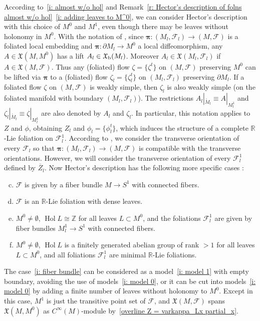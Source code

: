 \documentclass{memo-l}
\theoremstyle{plain}
\theoremstyle{definition}
\theoremstyle{remark}
\newcommand{\R}{\mathbb{R}}
\newcommand{\Z}{\mathbb{Z}}
\newcommand{\FF}{\mathcal{F}}
\newcommand{\fX}{\mathfrak{X}}
\newcommand{\bfpi}{\boldsymbol{\pi}}
\newcommand{\Hol}{\operatorname{Hol}}
\newcommand{\fXb}{\fX_{\text{\rm b}}}
\numberwithin{section}{chapter}
\numberwithin{equation}{section}%
\begin{document}
According to~\ref{i: almost w/o hol} and Remark~\ref{r: Hector's description of folns almost w/o hol}~\ref{i: adding leaves to M^0}, we can consider Hector's description with this choice of $M^0$ and $M^1$, even though there may be leaves without holonomy in $M^0$. With the notation of , since $\bfpi:(M_l,\FF_l)\to(M,\FF)$ is a foliated local embedding and $\bfpi:\partial M_l\to M^0$ a local diffeomorphism, any $A\in\fX(M,M^0)$ has a lift $A_l\in\fXb(M_l)$. Moreover $A_l\in\fX(M_l,\FF_l)$ if $A\in\fX(M,\FF)$. Thus any (foliated) flow $\zeta=\{\zeta^t\}$ on $(M,\FF)$ preserving $M^0$ can be lifted via $\bfpi$ to a (foliated) flow $\zeta_l=\{\zeta_l^t\}$ on $(M_l,\FF_l)$ preserving $\partial M_l$. If a foliated flow $\zeta$ on $(M,\FF)$ is weakly simple, then $\zeta_l$ is also weakly simple (on the foliated manifold with boundary $(M_l,\FF_l)$). The restrictions $A_l|_{\mathring M_l}\equiv A|_{M^1_l}$ and $\zeta_l|_{\mathring M_l}\equiv\zeta|_{M^1_l}$ are also denoted by $A_l$ and $\zeta_l$. In particular, this notation applies to $Z$ and $\phi$, obtaining $Z_l$ and $\phi_l=\{\phi_l^t\}$, which induces the structure of a complete $\R$-Lie foliation on $\FF^1_l$. According to , we consider the transverse orientation of every $\FF_l$ so that $\bfpi:(M_l,\FF_l)\to(M,\FF)$ is compatible with the transverse orientations. However, we will consider the transverse orientation of every $\FF^1_l$ defined by $\overline Z_l$. Now Hector's description has the following more specific cases \cite[Section~3]{AlvKordyLeichtnam2022}:
\begin{enumerate}[(a)]
\setcounter{enumi}{2}
\item\label{i: fiber bundle} $\FF$ is given by a fiber bundle $M\to S^1$ with connected fibers.

\item\label{i: minimal Lie foln} $\FF$ is an $\R$-Lie foliation with dense leaves.

\item\label{i: all folns FF_l are models (1)} $M^0\ne\emptyset$, $\Hol L\cong\Z$ for all leaves $L\subset M^0$, and the foliations $\FF^1_l$ are given by fiber bundles $M^1_l\to S^1$ with connected fibers.

\item\label{i: all folns FF_l are models (2)} $M^0\ne\emptyset$, $\Hol L$ is a finitely generated abelian group of rank $>1$ for all leaves $L\subset M^0$, and all foliations $\FF^1_l$ are minimal $\R$-Lie foliations.

\end{enumerate}
The case~\ref{i: fiber bundle} can be considered as a model~\ref{i: model 1} with empty boundary, avoiding the use of models~\ref{i: model 0}, or it can be cut into models~\ref{i: model 0} by adding a finite number of leaves without holonomy to $M^0$. Except in this case, $M^1$ is just the transitive point set of $\FF$, and $\fX(M,\FF)$ spans $\fX(M,M^0)$ as $C^\infty(M)$-module by~\eqref{overline Z = varkappa_Lx partial_x}.
\end{document}
